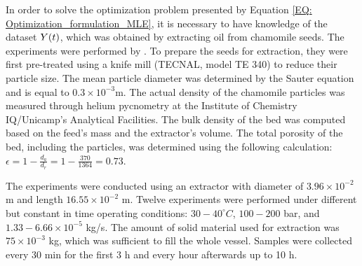 \documentclass[../Article_Model_Parameters.tex]{subfiles}
\begin{document}
	
	\label{CH: Experiments}
	
	In order to solve the optimization problem presented by Equation \ref{EQ: Optimization_formulation_MLE}, it is necessary to have knowledge of the dataset ${\color{black}Y}(t)$, which was obtained by extracting oil from chamomile seeds. The experiments were performed by \citet{Povh2001}. To prepare the seeds for extraction, they were first pre-treated using a knife mill (TECNAL, model TE 340) to reduce their particle size. The mean
	particle diameter was determined by the Sauter equation and is equal to $0.3\times 10^{-3}$m. The actual density of the chamomile particles was measured through helium pycnometry at the Institute of Chemistry IQ/Unicamp's Analytical Facilities. The bulk density of the bed was computed based on the feed's mass and the extractor's volume. The total porosity of the bed, including the particles, was determined using the following calculation: $\epsilon=1-\frac{d_a}{d_r} = 1-\frac{370}{1364} = 0.73$.
	
	
	The experiments were conducted using an extractor with diameter of $3.96\times 10^{-2}$ m and length $16.55\times 10^{-2}$ m. Twelve experiments were performed under different but constant in time operating conditions: $30-40^\circ C$, $100 - 200$ bar, and $1.33-6.66 \times 10^{-5}$ kg/s. The amount of solid material used for extraction was $75\times 10^{-3}$ kg, which was sufficient to fill the whole vessel. Samples were collected every 30 min for the first 3 h and every hour afterwards up to 10 h. 
	
	
	
\end{document}
